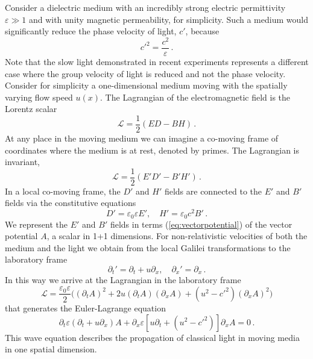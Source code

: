 \documentclass[12pt,amsmath,amssymb]{article}
\numberwithin{equation}{section}
\begin{document}
Consider a dielectric medium with an incredibly strong electric
permittivity $\varepsilon \gg 1$ and with unity magnetic permeability,
for simplicity. Such a medium would significantly reduce the
phase velocity of light, $c'$, because
\begin{equation}
c'^2 = \frac{c^2}{\varepsilon} \,.
\end{equation}
Note that the slow light \cite{LeoSlow,Lukin} demonstrated
in recent experiments \cite{Hau,Liu,Philips} represents
a different case where the group velocity of light is reduced
and not the phase velocity.
Consider for simplicity a one-dimensional medium moving
with the spatially varying flow speed $u(x)$.
The Lagrangian of the electromagnetic field
is the Lorentz scalar \cite{LL2,LeoSpace}
\begin{equation}
{\mathscr L}=
\frac{1}{2} \left(ED - BH\right) \,.
\end{equation}
At any place in the moving medium we can imagine a co-moving
frame of coordinates where the medium is at rest,
denoted by primes. The Lagrangian is invariant,
\begin{equation}
{\mathscr L}=
\frac{1}{2} \left(E'D' - B'H'\right)  \,.
\end{equation}
In a local co-moving frame, the $D'$ and $H'$ fields
are connected to the $E'$ and $B'$ fields via the
constitutive equations \cite{Jackson,LL8}
\begin{equation}
D' = \varepsilon_0\varepsilon E' ,\quad
H' = \varepsilon_0 c^2 B'  \,.
\end{equation}
We represent the $E'$ and $B'$ fields in terms (\ref{eq:vectorpotential})
of the vector potential $A$, a scalar in 1+1 dimensions.
For non-relativistic velocities of both the medium and the light
we obtain from the local Galilei transformations to the laboratory frame
\begin{equation}
\partial_t' = \partial_t + u \partial_x ,\quad \partial_x' = \partial_x \,.
\end{equation}
In this way we arrive at the Lagrangian in the laboratory frame
\begin{equation}
\label{eq:lmove}
{\mathscr L}=\frac{\varepsilon_0\varepsilon}{2}
\Big((\partial_t A)^2 + 2u(\partial_t A)(\partial_x A) +
(u^2-c'^2)(\partial_x A)^2\Big)
\end{equation}
that generates the Euler-Lagrange equation \cite{LL2}
\begin{equation}
\label{eq:wavemove}
\partial_t \varepsilon (\partial_t + u\partial_x) A +
\partial_x \varepsilon [ u\partial_t + (u^2 - c'^2)]\partial_x A = 0 \,.
\end{equation}
This wave equation describes the propagation of classical light
in moving media in one spatial dimension.
\end{document}
